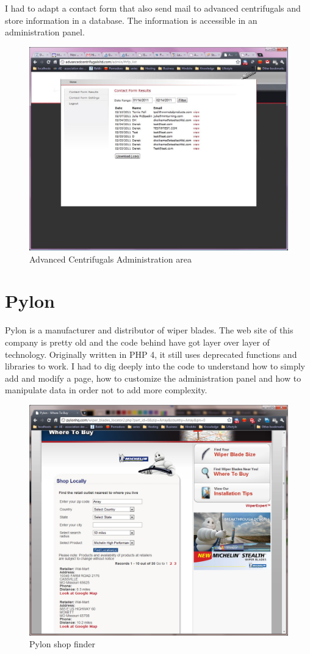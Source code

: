 I had to adapt a contact form that also send mail to advanced centrifugals and store information in a database.
The information is accessible in an administration panel.

\begin{figure}[!h]
\centering
\includegraphics[width=.55\textwidth]{img/adv_2.jpg}
\caption{Advanced Centrifugals Administration area}
\label{figure:adv_2}
\end{figure}

\section{Pylon}

Pylon is a manufacturer and distributor of wiper blades. The web site of this company is pretty old and the code behind have got layer over layer of technology. Originally written in PHP 4, it still uses deprecated functions and libraries to work. 
I had to dig deeply into the code to understand how to simply add and modify a page, how to customize the administration panel and how to manipulate data in order not to add more complexity.

\begin{figure}[!h]
\centering
\includegraphics[width=.55\textwidth]{img/pylon_v.png}
\caption{Pylon shop finder}
\label{figure:pyl_shop}
\end{figure}
 
